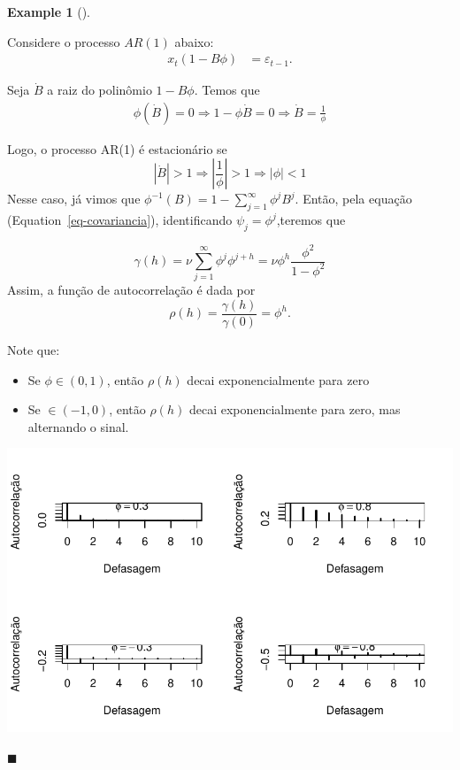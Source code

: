 \documentclass[
  letterpaper,
  DIV=11,
  numbers=noendperiod]{scrartcl}
\theoremstyle{plain}
\theoremstyle{plain}
\theoremstyle{definition}
\newtheorem{example}{Example}[chapter]
\theoremstyle{definition}
\theoremstyle{remark}
\begin{document}
\begin{example}[]\protect\hypertarget{exm-}{}\label{exm-}

Considere o processo \(AR(1)\) abaixo: \[\begin{align*}
    x_t(1-B\phi)&= \varepsilon_{t-1}.
\end{align*}\]

Seja \(\dot{B}\) a raiz do polinômio \(1-B\phi\). Temos que
\[\begin{align*}
    \phi(\dot{B})=0\Rightarrow 1-\phi \dot{B} =0 \Rightarrow \dot{B} =\frac{1}{\phi}
\end{align*}\]

Logo, o processo AR(1) é estacionário se
\[|\dot{B}|>1\Rightarrow \left|\frac{1}{\phi}\right|>1\Rightarrow |\phi|< 1\]
Nesse caso, já vimos que \(\phi^{-1}(B)=1-\sum_{j=1}^\infty\phi^j B^j\).
Então, pela equação (Equation~\ref{eq-covariancia}), identificando
\(\psi_j=\phi^j\),teremos que

\[\gamma(h)=\nu\sum_{j=1}^\infty \phi^j\phi^{j+h}=\nu\phi^h\frac{\phi^2}{1-\phi^2} \]
Assim, a função de autocorrelação é dada por
\[\rho(h)=\frac{\gamma(h)}{\gamma(0)}=\phi^h.\]

Note que:

\begin{itemize}
\item
  Se \(\phi\in(0,1)\), então \(\rho(h)\) decai exponencialmente para
  zero
\item
  Se \(\in(-1,0)\), então \(\rho(h)\) decai exponencialmente para zero,
  mas alternando o sinal.
\end{itemize}

\includegraphics{processo_linear_geral_files/figure-pdf/unnamed-chunk-1-1.pdf}

\(\blacksquare\)

\end{example}
\end{document}
